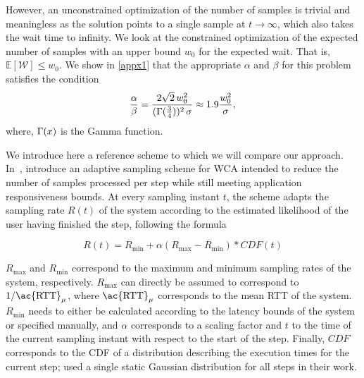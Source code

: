 However, an unconstrained optimization of the number of samples is trivial and meaningless as the solution points to a single sample at $t\!\rightarrow\!\infty$, which also takes the wait time to infinity.
We look at the constrained optimization of the expected number of samples with an upper bound $w_0$ for the expected wait.
That is, $\mathbb{E}[\mathcal{W}]\!\leq\!w_0$. We show in \cref{appx1} that the appropriate $\alpha$ and $\beta$ for this problem satisfies the condition
\begin{alignat}{1}
\frac{\alpha}{\beta}=\frac{2\sqrt{2}\,w_0^2}{(\mathlarger{\Gamma}(\tfrac{3}{4}))^2\,\sigma}\approx1.9\frac{w_0^2}{\sigma},\nonumber
\end{alignat}
where, $\mathlarger{\Gamma}(x)$ is the Gamma function.

\medskip

We introduce here a reference scheme to which we will compare our approach.
In~\cite{Wang2019Towards}, \citeauthor{Wang2019Towards} introduce an adaptive sampling scheme for \ac{WCA} intended to reduce the number of samples processed per step while still meeting application responsiveness bounds.
At every sampling instant \( t \), the scheme adapts the sampling rate \( R(t) \) of the system according to the estimated likelihood of the user having finished the step,
following the formula 

\begin{equation}
    R(t) = R_\text{min} + \alpha\left( R_\text{max} - R_\text{min} \right) * CDF(t)
\end{equation}

\( R_\text{max} \) and \( R_\text{min} \) correspond to the maximum and minimum sampling rates of the system, respectively.
\( R_\text{max} \) can directly be assumed to correspond to \( 1 / \text{\ac{RTT}}_\mu \), where \( \text{\ac{RTT}}_\mu \) corresponds to the mean \ac{RTT} of the system.
\( R_\text{min} \) needs to either be calculated according to the latency bounds of the system or specified manually, and \( \alpha \) corresponds to a scaling factor and \( t \) to the time of the current sampling instant with respect to the start of the step.
Finally, \( CDF \) corresponds to the \ac{CDF} of a distribution describing the execution times for the current step; \citeauthor{Wang2019Towards} used a single static Gaussian distribution for all steps in their work.


